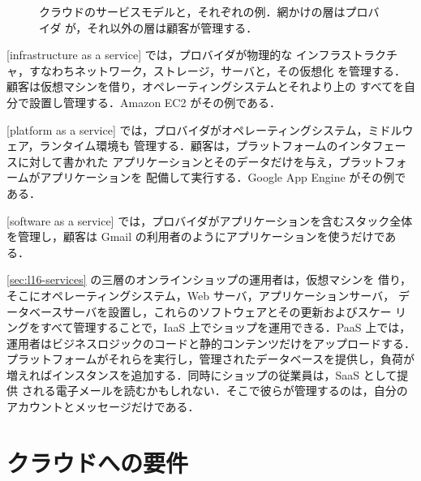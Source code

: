 \documentclass[../main.tex]{subfiles}
\begin{document}
\begin{figure}[htbp]
  \centering
  
  \caption{クラウドのサービスモデルと，それぞれの例．網かけの層はプロバイダ
    が，それ以外の層は顧客が管理する．}
  \label{fig:l16-service-models}
\end{figure}

[infrastructure as a service]%
では，プロバイダが物理的な
インフラストラクチャ，すなわちネットワーク，ストレージ，サーバと，その仮想化
を管理する．顧客は仮想マシンを借り，オペレーティングシステムとそれより上の
すべてを自分で設置し管理する．Amazon EC2 がその例である．

[platform as a service]%
では，プロバイダがオペレーティングシステム，ミドルウェア，ランタイム環境も
管理する．顧客は，プラットフォームのインタフェースに対して書かれた
アプリケーションとそのデータだけを与え，プラットフォームがアプリケーションを
配備して実行する．Google App Engine がその例である．

[software as a service]%
では，プロバイダがアプリケーションを含むスタック全体を管理し，顧客は Gmail
の利用者のようにアプリケーションを使うだけである．

\begin{example}
  \cref{sec:l16-services} の三層のオンラインショップの運用者は，仮想マシンを
  借り，そこにオペレーティングシステム，Web サーバ，アプリケーションサーバ，
  データベースサーバを設置し，これらのソフトウェアとその更新およびスケー
  リングをすべて管理することで，IaaS 上でショップを運用できる．PaaS 上では，
  運用者はビジネスロジックのコードと静的コンテンツだけをアップロードする．
  プラットフォームがそれらを実行し，管理されたデータベースを提供し，負荷が
  増えればインスタンスを追加する．同時にショップの従業員は，SaaS として提供
  される電子メールを読むかもしれない．そこで彼らが管理するのは，自分の
  アカウントとメッセージだけである．
\end{example}

\section{クラウドへの要件}
\label{sec:l16-requirements}
\end{document}

